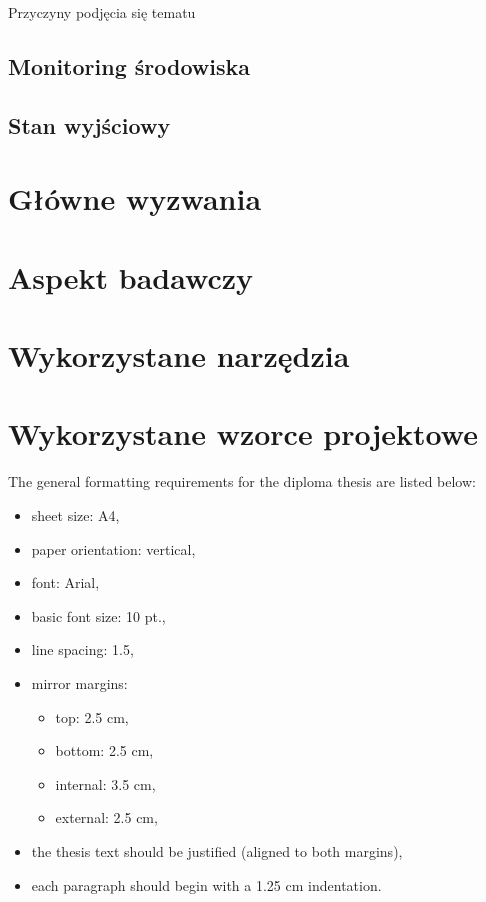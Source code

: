 Przyczyny podjęcia się tematu

\subsection{Monitoring środowiska}

\subsection{Stan wyjściowy}

\section{Główne wyzwania}

\section{Aspekt badawczy}

\section{Wykorzystane narzędzia}

\section{Wykorzystane wzorce projektowe}




The general formatting requirements for the diploma thesis are listed below:
\begin{itemize}
	\item sheet size: A4,
	\item paper orientation: vertical,
	\item font: Arial,
	\item basic font size: 10 pt.,
	\item line spacing: 1.5,
	\item mirror margins:
	\begin{itemize}
		\item top: 2.5 cm,
		\item bottom: 2.5 cm,
		\item internal: 3.5 cm,
		\item external: 2.5 cm,
	\end{itemize}
	\item the thesis text should be justified (aligned to both margins),
	\item each paragraph should begin with a 1.25 cm indentation.
\end{itemize}


